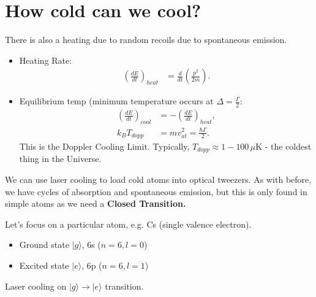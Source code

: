 \documentclass[a4paper, 11pt, normalem]{report}
\begin{document}
\section{How cold can we cool?}
There is also a heating due to random recoils due to spontaneous emission.
\begin{figure}[H]
    \centering
\end{figure}
\begin{itemize}
    \item Heating Rate:
        \begin{align}
            \left(\frac{dE}{dt}\right)_{heat} &= \frac{d}{dt}\left(\frac{p^2}{2m}\right).
        \end{align}
    \item Equilibrium temp (minimum temperature occurs at $\Delta=\frac{\Gamma}{2}$:
        \begin{align}
            \left(\frac{dE}{dt}\right)_{cool} &= -\left(\frac{dE}{dt}\right)_{heat}, \\
            k_BT_{dopp} &= mv^2_{at} = \frac{\hbar\Gamma}{2}.
        \end{align}
        This is the Doppler Cooling Limit.
        Typically, $T_{dopp}\approx1-100\,\mu$K - the coldest thing in the Universe.
\end{itemize}
We can use laser cooling to load cold atoms into optical tweezers.
As with before, we have cycles of absorption and spontaneous emission, but this is only found in simple atoms as we need a \textbf{Closed Transition.}

Let's focus on a particular atom, e.g. Cs (single valence electron).
\begin{itemize}
    \item Ground state $|g\rangle$, 6s ($n=6,l=0$)
    \item Excited state $|e\rangle$, 6p ($n=6,l=1$)
\end{itemize}
Laser cooling on $|g\rangle\to|e\rangle$ transition.
\end{document}
